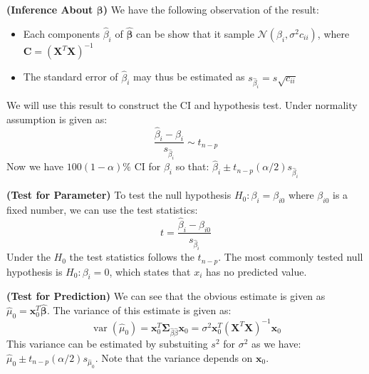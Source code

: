 \begin{remark}{\textbf{(Inference About $\boldsymbol{\beta}$)}}
    We have the following observation of the result:
    \begin{itemize}
        \item Each components $\hat{\beta}_i$ of $\hat{\boldsymbol \beta}$ can be show that it sample $\mathcal{N}(\beta_i, \sigma^2c_{ii})$, where $\boldsymbol C = (\boldsymbol X^T\boldsymbol X)^{-1}$
        \item The standard error of $\hat{\beta}_i$ may thus be estimated as $s_{\hat{\beta}_i} = s\sqrt{c_{ii}}$
    \end{itemize}
    We will use this result to construct the CI and hypothesis test. Under normality assumption is given as:
    \begin{equation*}
        \frac{\hat{\beta}_i - \beta_i}{s_{\hat{\beta}_i}} \sim t_{n-p}
    \end{equation*}
    Now we have $100(1-\alpha)\%$ CI for $\beta_i$ so that: $\hat{\beta}_i \pm t_{n-p}(\alpha/2)s_{\hat{\beta}_i}$
\end{remark}

\begin{remark}{\textbf{(Test for Parameter)}}
    To test the null hypothesis $H_0 : \beta_i = \beta_{i0}$ where $\beta_{i0}$ is a fixed number, we can use the test statistics:
    \begin{equation*}
        t = \frac{\hat{\beta}_i -\beta_{i0}}{s_{\hat{\beta}_i}}
    \end{equation*}
    Under the $H_0$ the test statistics follows the $t_{n-p}$. The most commonly tested null hypothesis is $H_0 : \beta_i =0$, which states that $x_i$ has no predicted value.
\end{remark}

\begin{remark}{\textbf{(Test for Prediction)}}
    We can see that the obvious estimate is given as $\hat{\mu}_0 = \boldsymbol x_0^T\hat{\boldsymbol \beta}$. The variance of this estimate is given as:
    \begin{equation*}
        \operatorname{var}(\hat{\mu}_0) = \boldsymbol x_0^T\boldsymbol \Sigma_{\hat{\beta}\hat{\beta}}\boldsymbol x_0 = \sigma^2\boldsymbol x_0^T(\boldsymbol X^T\boldsymbol X)^{-1}\boldsymbol x_0
    \end{equation*}
    This variance can be estimated by substuiting $s^2$ for $\sigma^2$ as we have: $\hat{\mu}_0 \pm t_{n-p}(\alpha/2)s_{\hat{\mu}_0}$. Note that the variance depends on $\boldsymbol x_0$.
\end{remark}

